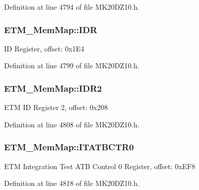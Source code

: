 Definition at line 4794 of file M\+K20\+D\+Z10.\+h.

\subsubsection[{\texorpdfstring{I\+DR}{IDR}}]{ E\+T\+M\+\_\+\+Mem\+Map\+::\+I\+DR}\hypertarget{struct_e_t_m___mem_map_a86a9b1a2c070dbd2726e755884425de5}{}\label{struct_e_t_m___mem_map_a86a9b1a2c070dbd2726e755884425de5}
ID Register, offset\+: 0x1\+E4 

Definition at line 4799 of file M\+K20\+D\+Z10.\+h.

\subsubsection[{\texorpdfstring{I\+D\+R2}{IDR2}}]{ E\+T\+M\+\_\+\+Mem\+Map\+::\+I\+D\+R2}\hypertarget{struct_e_t_m___mem_map_a584ac31c6dcec464f98ceece5b76d1f6}{}\label{struct_e_t_m___mem_map_a584ac31c6dcec464f98ceece5b76d1f6}
E\+TM ID Register 2, offset\+: 0x208 

Definition at line 4808 of file M\+K20\+D\+Z10.\+h.

\subsubsection[{\texorpdfstring{I\+T\+A\+T\+B\+C\+T\+R0}{ITATBCTR0}}]{ E\+T\+M\+\_\+\+Mem\+Map\+::\+I\+T\+A\+T\+B\+C\+T\+R0}\hypertarget{struct_e_t_m___mem_map_aa5fdf34d92821f87bbcde2dbb43a6d3c}{}\label{struct_e_t_m___mem_map_aa5fdf34d92821f87bbcde2dbb43a6d3c}
E\+TM Integration Test A\+TB Control 0 Register, offset\+: 0x\+E\+F8 

Definition at line 4818 of file M\+K20\+D\+Z10.\+h.


